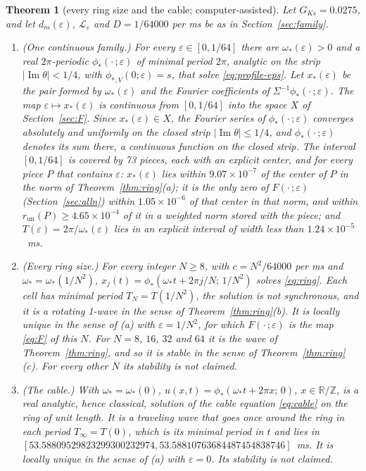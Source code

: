 \documentclass[11pt]{article}
\newtheorem{theorem}{Theorem}
\theoremstyle{definition}
\newcommand{\R}{\mathbb{R}}
\newcommand{\Z}{\mathbb{Z}}
\newcommand{\im}{\operatorname{Im}}
\begin{document}
\begin{theorem}[every ring size and the cable; computer-assisted]\label{thm:alln}
Let $G_{Ks} = 0.0275$, and let $d_m(\varepsilon)$, $\mathcal L_\varepsilon$ and $D = 1/64000$ per ms be as in Section~\ref{sec:family}.
\begin{enumerate}
\item[(a)] (One continuous family.) For every $\varepsilon \in [0, 1/64]$ there are $\omega_*(\varepsilon) > 0$ and a real $2\pi$-periodic $\phi_*(\cdot\,;\varepsilon)$ of minimal period $2\pi$, analytic on the strip $|\im\theta| < 1/4$, with $\phi_{*,V}(0;\varepsilon) = s$, that solve \eqref{eq:profile-eps}. Let $x_*(\varepsilon)$ be the pair formed by $\omega_*(\varepsilon)$ and the Fourier coefficients of $\Sigma^{-1}\phi_*(\cdot\,;\varepsilon)$. The map $\varepsilon \mapsto x_*(\varepsilon)$ is continuous from $[0, 1/64]$ into the space $X$ of Section~\ref{sec:F}. Since $x_*(\varepsilon) \in X$, the Fourier series of $\phi_*(\cdot\,;\varepsilon)$ converges absolutely and uniformly on the closed strip $|\im\theta| \le 1/4$, and $\phi_*(\cdot\,;\varepsilon)$ denotes its sum there, a continuous function on the closed strip. The interval $[0, 1/64]$ is covered by 73 pieces, each with an explicit center, and for every piece $P$ that contains $\varepsilon$: $x_*(\varepsilon)$ lies within $9.07 \times 10^{-7}$ of the center of $P$ in the norm of Theorem~\ref{thm:ring}(a); it is the only zero of $F(\cdot\,;\varepsilon)$ (Section~\ref{sec:alln}) within $1.05 \times 10^{-6}$ of that center in that norm, and within $r_{\mathrm{un}}(P) \ge 4.65 \times 10^{-4}$ of it in a weighted norm stored with the piece; and $T(\varepsilon) = 2\pi/\omega_*(\varepsilon)$ lies in an explicit interval of width less than $1.24 \times 10^{-5}$~ms.
\item[(b)] (Every ring size.) For every integer $N \ge 8$, with $c = N^2/64000$ per ms and $\omega_* = \omega_*(1/N^2)$, $x_j(t) = \phi_*(\omega_*t + 2\pi j/N;\, 1/N^2)$ solves \eqref{eq:ring}. Each cell has minimal period $T_N = T(1/N^2)$, the solution is not synchronous, and it is a rotating 1-wave in the sense of Theorem~\ref{thm:ring}(b). It is locally unique in the sense of (a) with $\varepsilon = 1/N^2$, for which $F(\cdot\,;\varepsilon)$ is the map \eqref{eq:F} of this $N$. For $N = 8$, $16$, $32$ and $64$ it is the wave of Theorem~\ref{thm:ring}, and so it is stable in the sense of Theorem~\ref{thm:ring}(c). For every other $N$ its stability is not claimed.
\item[(c)] (The cable.) With $\omega_* = \omega_*(0)$, $u(x, t) = \phi_*(\omega_*t + 2\pi x;\, 0)$, $x \in \R/\Z$, is a real analytic, hence classical, solution of the cable equation \eqref{eq:cable} on the ring of unit length. It is a traveling wave that goes once around the ring in each period $T_\infty = T(0)$, which is its minimal period in $t$ and lies in $[53.58809529823299300232974, 53.58810763684487454838746]$~ms. It is locally unique in the sense of (a) with $\varepsilon = 0$. Its stability is not claimed.

\end{enumerate}
\end{theorem}
\end{document}
